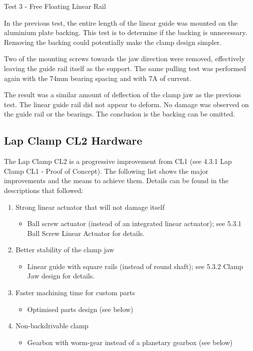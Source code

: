 Test 3 - Free Floating Linear Rail

In the previous test, the entire length of the linear guide was mounted on the aluminium plate backing. This test is to determine if the backing is unnecessary. Removing the backing could potentially make the clamp design simpler.

Two of the mounting screws towards the jaw direction were removed, effectively leaving the guide rail itself as the support. The same pulling test was performed again with the 74mm bearing spacing and with 7A of current.

The result was a similar amount of deflection of the clamp jaw as the previous test. The linear guide rail did not appear to deform. No damage was observed on the guide rail or the bearings. The conclusion is the backing can be omitted.

\subsection{Lap Clamp CL2 Hardware}
\label{subsection:exploration_2_lap_clamp_cl2_hardware}

The Lap Clamp CL2 is a progressive improvement from CL1 (see 4.3.1 Lap Clamp CL1 - Proof of Concept). The following list shows the major improvements and the means to achieve them. Details can be found in the descriptions that followed:
\begin{enumerate}
\item Strong linear actuator that will not damage itself
    \begin{itemize}
        \item Ball screw actuator (instead of an integrated linear actuator); see 5.3.1 Ball Screw Linear Actuator for details.
    \end{itemize}
    \item Better stability of the clamp jaw 
    \begin{itemize}
        \item Linear guide with square rails (instead of round shaft); see 5.3.2 Clamp Jaw design for details.
    \end{itemize}
    \item Faster machining time for custom parts
    \begin{itemize}
        \item Optimised parts design (see below)
    \end{itemize}
    \item Non-backdrivable clamp
    \begin{itemize}
        \item Gearbox with worm-gear instead of a planetary gearbox (see below)
    \end{itemize}
\end{enumerate}

